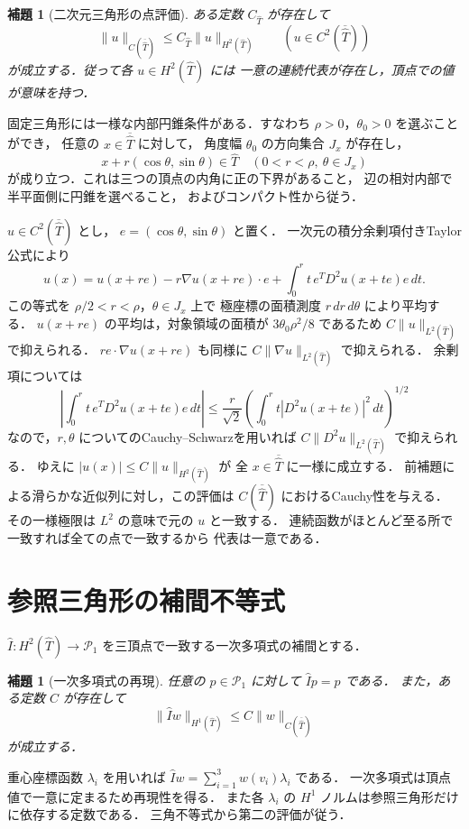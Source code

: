 \documentclass[a5paper,10pt,onecolumn]{jsarticle}
\makeatletter
\theoremstyle{mathnotetheorem}
\newtheorem{lemma}[theorem]{補題}
\renewcommand{\proofname}{証明}
\renewenvironment{proof}[1][\proofname]{%
  \par\pushQED{\qed}\normalfont\topsep4\p@\@plus2\p@\relax
  \trivlist\item[\hskip\labelsep\bfseries #1]\ignorespaces
}{\popQED\endtrivlist\@endpefalse}
\newcommand{\norm}[1]{\lVert #1\rVert}
\makeatother
\begin{document}
\begin{lemma}[二次元三角形の点評価]
ある定数 $C_{\widehat T}$ が存在して
\[
 \norm u_{C(\overline{\widehat T})}
 \le C_{\widehat T}\norm u_{H^2(\widehat T)}
 \qquad(u\in C^2(\overline{\widehat T}))
\]
が成立する．従って各 $u\in H^2(\widehat T)$ には
一意の連続代表が存在し，頂点での値が意味を持つ．
\end{lemma}
\begin{proof}
固定三角形には一様な内部円錐条件がある．すなわち
$\rho>0$，$\theta_0>0$ を選ぶことができ，
任意の $x\in\overline{\widehat T}$ に対して，
角度幅 $\theta_0$ の方向集合 $J_x$ が存在し，
\[
 x+r(\cos\theta,\sin\theta)\in\widehat T
 \quad(0<r<\rho,\ \theta\in J_x)
\]
が成り立つ．これは三つの頂点の内角に正の下界があること，
辺の相対内部で半平面側に円錐を選べること，
およびコンパクト性から従う．

$u\in C^2(\overline{\widehat T})$ とし，
$e=(\cos\theta,\sin\theta)$ と置く．
一次元の積分余剰項付きTaylor公式により
\[
 u(x)=u(x+re)-r\nabla u(x+re)\cdot e
       +\int_0^r t\,e^TD^2u(x+te)e\,dt.
\]
この等式を $\rho/2<r<\rho$，$\theta\in J_x$ 上で
極座標の面積測度 $r\,dr\,d\theta$ により平均する．
$u(x+re)$ の平均は，対象領域の面積が
$3\theta_0\rho^2/8$ であるため
$C\norm u_{L^2(\widehat T)}$ で抑えられる．
$re\cdot\nabla u(x+re)$ も同様に
$C\norm{\nabla u}_{L^2(\widehat T)}$ で抑えられる．
余剰項については
\[
 \left|\int_0^r t\,e^TD^2u(x+te)e\,dt\right|
 \le\frac r{\sqrt2}
  \left(\int_0^r t|D^2u(x+te)|^2\,dt\right)^{1/2}
\]
なので，$r,\theta$ についてのCauchy--Schwarzを用いれば
$C\norm{D^2u}_{L^2(\widehat T)}$ で抑えられる．
ゆえに $|u(x)|\le C\norm u_{H^2(\widehat T)}$ が
全 $x\in\overline{\widehat T}$ に一様に成立する．
前補題による滑らかな近似列に対し，この評価は
$C(\overline{\widehat T})$ におけるCauchy性を与える．
その一様極限は $L^2$ の意味で元の $u$ と一致する．
連続函数がほとんど至る所で一致すれば全ての点で一致するから
代表は一意である．
\end{proof}

\section{参照三角形の補間不等式}
$\widehat I:H^2(\widehat T)\to\mathcal P_1$
を三頂点で一致する一次多項式の補間とする．

\begin{lemma}[一次多項式の再現]
任意の $p\in\mathcal P_1$ に対して $\widehat Ip=p$ である．
また，ある定数 $C$ が存在して
\[
 \norm{\widehat Iw}_{H^1(\widehat T)}
 \le C\norm w_{C(\overline{\widehat T})}
\]
が成立する．
\end{lemma}
\begin{proof}
重心座標函数 $\lambda_i$ を用いれば
$\widehat Iw=\sum_{i=1}^3 w(v_i)\lambda_i$ である．
一次多項式は頂点値で一意に定まるため再現性を得る．
また各 $\lambda_i$ の $H^1$ ノルムは参照三角形だけに依存する定数である．
三角不等式から第二の評価が従う．
\end{proof}
\end{document}
